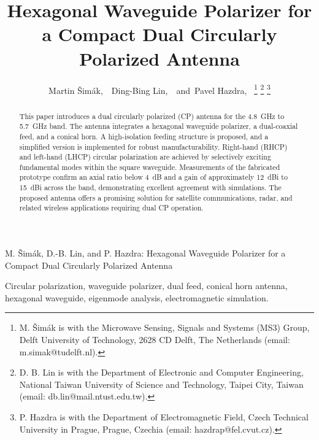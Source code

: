 \documentclass[journal,9pt]{IEEEtran}
\begin{document}
\title{\huge{Hexagonal Waveguide Polarizer for a Compact Dual Circularly Polarized Antenna}}

\author{Martin Šimák,~~Ding-Bing Lin,~~and~Pavel Hazdra,~%
\thanks{M. Šimák is with the Microwave Sensing, Signals and Systems (MS3) Group, Delft University of Technology, 2628 CD Delft, The Netherlands (email: m.simak@tudelft.nl).}%
\thanks{D. B. Lin is with the Department of Electronic and Computer Engineering, National Taiwan University of Science and Technology, Taipei City, Taiwan (email: db.lin@mail.ntust.edu.tw).}%
\thanks{P. Hazdra is with the Department of Electromagnetic Field, Czech Technical University in Prague, Prague, Czechia (email: hazdrap@fel.cvut.cz).}%
}

%
{M. Šimák, D.-B. Lin, and P. Hazdra: Hexagonal Waveguide Polarizer for a Compact Dual Circularly Polarized Antenna}


\maketitle

\begin{abstract}
    This paper introduces a dual circularly polarized (CP) antenna for the 4.8~GHz to 5.7~GHz band. The antenna integrates a hexagonal waveguide polarizer, a dual-coaxial feed, and a conical horn. A high-isolation feeding structure is proposed, and a simplified version is implemented for robust manufacturability. Right-hand (RHCP) and left-hand (LHCP) circular polarization are achieved by selectively exciting fundamental modes within the square waveguide. Measurements of the fabricated prototype confirm an axial ratio below 4~dB and a gain of approximately 12~dBi to 15~dBi across the band, demonstrating excellent agreement with simulations. The proposed antenna offers a promising solution for satellite communications, radar, and related wireless applications requiring dual CP operation.
\end{abstract}

\begin{IEEEkeywords}
Circular polarization, waveguide polarizer, dual feed, conical horn antenna, hexagonal waveguide, eigenmode analysis, electromagnetic simulation.
\end{IEEEkeywords}
\end{document}
